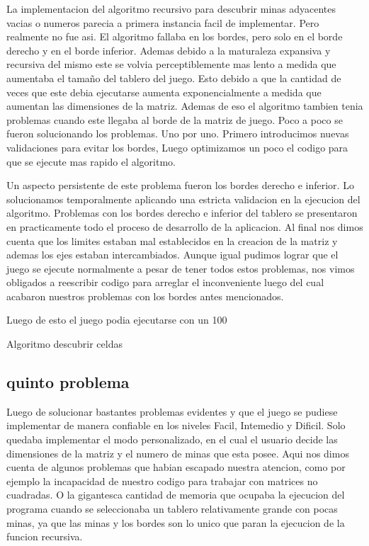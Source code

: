 \documentclass[11pt]{article} %
\begin{document}
La implementacion del algoritmo recursivo para descubrir minas adyacentes vacias o numeros parecia a primera instancia facil de implementar. Pero realmente no fue asi. El algoritmo fallaba en los bordes, pero solo en el borde derecho y en el borde inferior. 
Ademas debido a la maturaleza expansiva y recursiva del mismo este se volvia perceptiblemente mas lento a medida que aumentaba el tamaño del tablero del juego. Esto debido a que la cantidad de veces que este debia ejecutarse aumenta exponencialmente 
a medida que aumentan las dimensiones de la matriz. Ademas de eso el algoritmo tambien tenia problemas cuando este llegaba al borde de la matriz de juego. Poco a poco se fueron solucionando los problemas. Uno por uno. Primero introducimos nuevas validaciones para evitar los bordes, Luego optimizamos un poco el codigo para que se ejecute mas rapido el algoritmo.

Un aspecto persistente de este problema fueron los bordes derecho e inferior. Lo solucionamos temporalmente aplicando una estricta validacion en la ejecucion del algoritmo.
Problemas con los bordes derecho e inferior del tablero se presentaron en practicamente todo el proceso de desarrollo de la aplicacion. Al final nos dimos cuenta que los limites estaban mal establecidos en la creacion de la matriz y ademas los ejes estaban intercambiados. Aunque igual pudimos lograr que el juego se ejecute normalmente a pesar de tener todos estos problemas, nos vimos obligados a reescribir codigo para arreglar el inconveniente luego del cual acabaron nuestros problemas con los bordes antes mencionados.

Luego de esto el juego podia ejecutarse con un 100%


\begin{center}
Algoritmo descubrir celdas


\end{center}



\subsection{quinto problema }

Luego de solucionar bastantes problemas evidentes y que el juego se pudiese implementar de manera confiable en los niveles Facil, Intemedio y Dificil. Solo quedaba implementar el modo personalizado, en el cual el usuario decide las dimensiones de la matriz y el numero de minas que esta posee. Aqui nos dimos cuenta de algunos problemas que habian escapado nuestra atencion, como por ejemplo la incapacidad de nuestro codigo para trabajar con matrices no cuadradas. O la gigantesca cantidad de memoria que ocupaba la ejecucion del programa cuando se seleccionaba un tablero relativamente grande con pocas minas, ya que las minas y los bordes son lo unico que paran la ejecucion de la funcion recursiva. 
\end{document}
